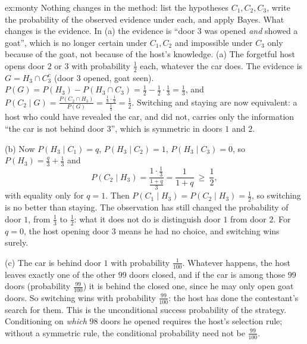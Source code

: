 \begin{solution}{ex:monty}
\idea Nothing changes in the method: list the hypotheses $C_1,C_2,C_3$, write the probability of the observed evidence under each, and apply Bayes. What changes is the evidence. In (a) the evidence is ``door $3$ was opened \emph{and} showed a goat'', which is no longer certain under $C_1,C_2$ and impossible under $C_3$ only because of the goat, not because of the host's knowledge.
\writeup (a) The forgetful host opens door $2$ or $3$ with probability $\frac12$ each, whatever the car does. The evidence is $G=H_3\cap C_3^c$ (door $3$ opened, goat seen). $P(G)=P(H_3)-P(H_3\cap C_3)=\frac12-\frac12\cdot\frac13=\frac13$, and $P(C_2\mid G)=\frac{P(C_2\cap H_3)}{P(G)}=\frac{\frac13\cdot\frac12}{\frac13}=\frac12$. Switching and staying are now equivalent: a host who could have revealed the car, and did not, carries only the information ``the car is not behind door $3$'', which is symmetric in doors $1$ and $2$.

(b) Now $P(H_3\mid C_1)=q$, $P(H_3\mid C_2)=1$, $P(H_3\mid C_3)=0$, so $P(H_3)=\frac q3+\frac13$ and
\[
P(C_2\mid H_3)=\frac{1\cdot\frac13}{\frac{1+q}3}=\frac1{1+q}\ \ge\ \frac12 ,
\]
with equality only for $q=1$. Then $P(C_1\mid H_3)=P(C_2\mid H_3)=\frac12$, so switching is no better than staying. The observation has still changed the probability of door $1$, from $\frac13$ to $\frac12$: what it does not do is distinguish door $1$ from door $2$. For $q=0$, the host opening door $3$ means he had no choice, and switching wins surely.

(c) The car is behind door $1$ with probability $\frac1{100}$. Whatever happens, the host leaves exactly one of the other $99$ doors closed, and if the car is among those $99$ doors (probability $\frac{99}{100}$) it is behind the closed one, since he may only open goat doors. So switching wins with probability $\frac{99}{100}$: the host has done the contestant's search for them. This is the unconditional success probability of the strategy. Conditioning on \emph{which} $98$ doors he opened requires the host's selection rule; without a symmetric rule, the conditional probability need not be $\frac{99}{100}$.
\end{solution}

